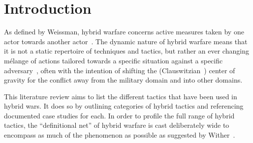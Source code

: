 \section{Introduction}

As defined by Weissman, hybrid warfare concerns active measures taken by one
actor towards another actor~\cite{weissmann2019hybrid}. The dynamic nature of
hybrid warfare means that it is not a static repertoire of techniques and
tactics, but rather an ever changing mélange of actions tailored towards a
specific situation against a specific adversary~\cite{schmid2019hybrid}, often
with the intention of shifting the (Clauswitzian~\cite{von1956war}) center of
gravity for the conflict away from the military domain and into other domains.

This literature review aims to list the different tactics that have been used in
hybrid wars. It does so by outlining categories of hybrid tactics and
referencing documented case studies for each. In order to profile the full range
of hybrid tactics, the ``definitional net'' of hybrid warfare is cast
deliberately wide to encompass as much of the phenomenon as possible as
suggested by Wither~\cite{wither2016making}.
